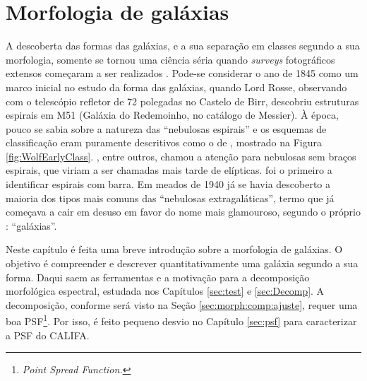 


\chapter{Morfologia de galáxias}
\label{sec:morph}

A descoberta das formas das galáxias, e a sua separação em classes segundo a sua
morfologia, somente se tornou uma ciência séria quando {\em surveys}
fotográficos extensos começaram a ser realizados \citep{Sandage1975}. Pode-se
considerar o ano de 1845 como um marco inicial no estudo da forma das galáxias,
quando Lord Rosse, observando com o telescópio refletor de 72 polegadas no
Castelo de Birr, descobriu estruturas espirais em M51 (Galáxia do Redemoinho, no
catálogo de Messier). À época, pouco se sabia sobre a natureza das ``nebulosas
espirais'' e os esquemas de classificação eram puramente descritivos como o de
\citet{Wolf1908}, mostrado na Figura \ref{fig:WolfEarlyClass}.
\citet{Knox-Shaw1915}, entre outros, chamou a atenção para nebulosas sem braços
espirais, que viriam a ser chamadas mais tarde de elípticas.
\citet{Curtis1918} foi o primeiro a identificar espirais com barra.
Em meados de 1940 já se havia descoberto a maioria dos tipos mais comuns das
``nebulosas extragaláticas'', termo que já começava a cair em desuso em favor do
nome mais glamouroso, segundo o próprio \citet{hubble1936}: ``galáxias''.

Neste capítulo é feita uma breve introdução sobre a morfologia de galáxias. O
objetivo é compreender e descrever quantitativamente uma galáxia segundo a sua
forma. Daqui saem as ferramentas e a motivação para a decomposição morfológica
espectral, estudada nos Capítulos \ref{sec:test} e \ref{sec:Decomp}. A
decomposição, conforme será visto na Seção \ref{sec:morph:comp:ajuste}, requer
uma boa PSF\footnote{{\em Point Spread Function.}}. Por isso, é feito pequeno
desvio no Capítulo \ref{sec:psf} para caracterizar a PSF do CALIFA.

